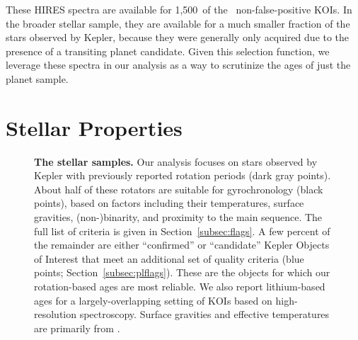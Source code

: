 \documentclass[11pt,twocolumn,tighten]{aastex63}
\newcommand{\nkoiswithhires}{{1{,}500}}
\begin{document}
These HIRES spectra are available for \nkoiswithhires\ of the
\nkoisnofp\ non-false-positive KOIs.
In the broader stellar sample, they are available for a much smaller 
fraction of the stars observed by Kepler, because they were generally only
acquired due to the presence of a transiting planet candidate.
Given this selection function,
we leverage these spectra in our analysis as a way to scrutinize the
ages of just the planet sample.



\section{Stellar Properties}
\label{sec:stellarprops}

\begin{figure}[!t]
	\begin{center}
%	
	\end{center}
	\vspace{-0.5cm}
	\caption{
    {\bf The stellar samples.}  Our analysis focuses on stars observed by Kepler with 
    previously reported
    rotation periods (dark gray points). 
    About half of these rotators are suitable for gyrochronology (black points),
    based on factors including their temperatures, surface gravities, (non-)binarity, and proximity to the main sequence.
    The full list of criteria is given in Section~\ref{subsec:flags}.
    A few percent of the remainder are either ``confirmed'' or ``candidate'' Kepler Objects of Interest that
    meet an additional set of quality criteria (blue points; Section~\ref{subsec:plflags}).
    These are the objects for which our rotation-based ages are most reliable.
    We also report lithium-based ages for a largely-overlapping setting of KOIs
    based on high-resolution spectroscopy.
    Surface gravities and effective temperatures are primarily from
    \citet{Berger_2020a_catalog}.
	}
	\label{fig:stellarprops}
\end{figure}


\end{document}
